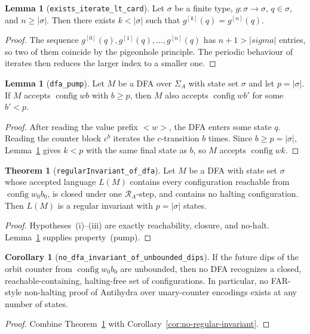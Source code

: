 \documentclass[11pt,a4paper]{article}
\theoremstyle{definition}
\newtheorem{lemma}[definition]{Lemma}
\newtheorem{theorem}[definition]{Theorem}
\newtheorem{corollary}[definition]{Corollary}
\newcommand{\lt}{<}
\newcommand{\gt}{>}
\newcommand{\config}{\operatorname{config}}
\newcommand{\antihydraSRS}{\mathcal{R}_{A}}
\begin{document}
\begin{lemma}[\texttt{exists\_iterate\_lt\_card}]
\label{lem:iterate-pigeonhole}
Let $\sigma$ be a finite type, $g:\sigma\to\sigma$, $q\in\sigma$, and
$n\ge|\sigma|$.  Then there exists $k<|\sigma|$ such that
$g^{[k]}(q)=g^{[n]}(q)$.
\end{lemma}
\begin{proof}
The sequence $g^{[0]}(q),g^{[1]}(q),\dots,g^{[n]}(q)$ has $n+1>|
sigma|$ entries, so two of them coincide by the pigeonhole principle.  The
periodic behaviour of iterates then reduces the larger index to a smaller
one.
\end{proof}

\begin{lemma}[\texttt{dfa\_pump}]
\label{lem:dfa-pump}
Let $M$ be a DFA over $\Sigma_A$ with state set $\sigma$ and let
$p=|\sigma|$.  If $M$ accepts $\config{w}{b}$ with $b\ge p$, then $M$
also accepts $\config{w}{b'}$ for some $b'<p$.
\end{lemma}
\begin{proof}
After reading the value prefix $\lt w\gt$, the DFA enters some state
$q$.  Reading the counter block $c^{b}$ iterates the $c$-transition
$b$ times.  Since $b\ge p=|\sigma|$,
Lemma~\ref{lem:iterate-pigeonhole} gives $k<p$ with the same final state
as $b$, so $M$ accepts $\config{w}{k}$.
\end{proof}

\begin{theorem}[\texttt{regularInvariant\_of\_dfa}]
\label{thm:regularInvariant-of-dfa}
Let $M$ be a DFA with state set $\sigma$ whose accepted language $L(M)$
contains every configuration reachable from $\config{w_0}{b_0}$, is closed
under one $\antihydraSRS$-step, and contains no halting configuration.
Then $L(M)$ is a regular invariant with $p=|\sigma|$ states.
\end{theorem}
\begin{proof}
Hypotheses~(i)--(iii) are exactly reachability, closure, and no-halt.
Lemma~\ref{lem:dfa-pump} supplies property~(pump).
\end{proof}

\begin{corollary}[\texttt{no\_dfa\_invariant\_of\_unbounded\_dips}]
\label{cor:no-dfa-invariant}
If the future dips of the orbit counter from $\config{w_0}{b_0}$ are
unbounded, then no DFA recognizes a closed, reachable-containing,
halting-free set of configurations.  In particular, no FAR-style
non-halting proof of Antihydra over unary-counter encodings exists at any
number of states.
\end{corollary}
\begin{proof}
Combine Theorem~\ref{thm:regularInvariant-of-dfa} with
Corollary~\ref{cor:no-regular-invariant}.
\end{proof}
\end{document}
